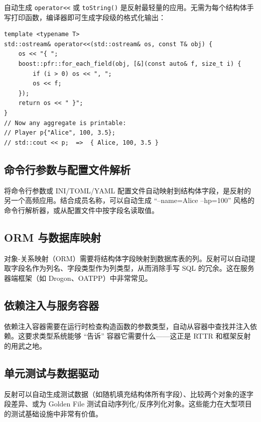 \documentclass[12pt,a4paper,fontset=fandol]{ctexbook}
\begin{document}
自动生成 \texttt{operator<<} 或 \texttt{toString()} 是反射最轻量的应用。无需为每个结构体手写打印函数，编译器即可生成字段级的格式化输出：

\begin{lstlisting}[caption={反射驱动日志: 自动打印任意结构体}]
template <typename T>
std::ostream& operator<<(std::ostream& os, const T& obj) {
    os << "{ ";
    boost::pfr::for_each_field(obj, [&](const auto& f, size_t i) {
        if (i > 0) os << ", ";
        os << f;
    });
    return os << " }";
}
// Now any aggregate is printable:
// Player p{"Alice", 100, 3.5};
// std::cout << p;  =>  { Alice, 100, 3.5 }
\end{lstlisting}

\subsection{命令行参数与配置文件解析}

将命令行参数或 INI/TOML/YAML 配置文件自动映射到结构体字段，是反射的另一个高频应用。结合成员名称，可以自动生成 ``--name=Alice --hp=100'' 风格的命令行解析器，或从配置文件中按字段名读取值。

\subsection{ORM 与数据库映射}

对象-关系映射（ORM）需要将结构体字段映射到数据库表的列。反射可以自动提取字段名作为列名、字段类型作为列类型，从而消除手写 SQL 的冗余。这在服务器端框架（如 Drogon、OATPP）中非常常见。

\subsection{依赖注入与服务容器}

依赖注入容器需要在运行时检查构造函数的参数类型，自动从容器中查找并注入依赖。这要求类型系统能够 ``告诉'' 容器它需要什么——这正是 RTTR 和框架反射的用武之地。

\subsection{单元测试与数据驱动}

反射可以自动生成测试数据（如随机填充结构体所有字段）、比较两个对象的逐字段差异、或为 Golden File 测试自动序列化/反序列化对象。这些能力在大型项目的测试基础设施中非常有价值。
\end{document}
